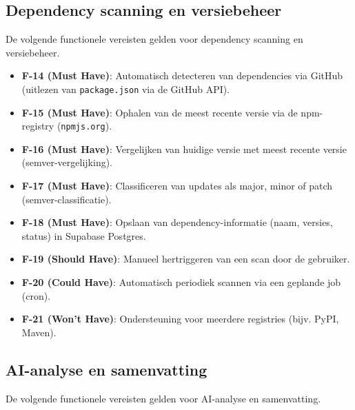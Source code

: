 \subsection{Dependency scanning en versiebeheer}
\label{sec:dependency-scanning}

De volgende functionele vereisten gelden voor dependency scanning en versiebeheer.

\begin{itemize}
  \item \textbf{F-14 (Must Have)}: Automatisch detecteren van dependencies via GitHub (uitlezen van \texttt{package.json} via de GitHub API).
  \item \textbf{F-15 (Must Have)}: Ophalen van de meest recente versie via de npm-registry (\texttt{npmjs.org}).
  \item \textbf{F-16 (Must Have)}: Vergelijken van huidige versie met meest recente versie (semver-vergelijking).
  \item \textbf{F-17 (Must Have)}: Classificeren van updates als major, minor of patch (semver-classificatie).
  \item \textbf{F-18 (Must Have)}: Opslaan van dependency-informatie (naam, versies, status) in Supabase Postgres.
  \item \textbf{F-19 (Should Have)}: Manueel hertriggeren van een scan door de gebruiker.
  \item \textbf{F-20 (Could Have)}: Automatisch periodiek scannen via een geplande job (cron).
  \item \textbf{F-21 (Won't Have)}: Ondersteuning voor meerdere registries (bijv. PyPI, Maven).
\end{itemize}


\subsection{AI-analyse en samenvatting}
\label{sec:ai-analyse}

De volgende functionele vereisten gelden voor AI-analyse en samenvatting.

